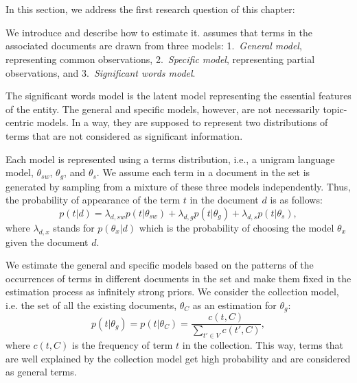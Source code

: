 \section{\SWLMs}
\label{sec:swlm}
In this section, we address the first research question of this chapter: 
\begin{resqbox}
\emph{}
\end{resqbox}
We introduce \SWLMs and describe how to estimate it. \acswlm assumes that terms in the associated documents are drawn from three models: 1.~\emph{General model}, representing common observations, 2.~\emph{Specific model}, representing partial observations, and 3.~\emph{Significant words model}. 

The significant words model is the latent model representing the essential features of the entity. The general and specific models, however, are not necessarily topic-centric models. In a way, they are supposed to represent two distributions of terms that are not considered as significant information. 

Each model is represented using a terms distribution, i.e., a unigram language model, $\theta_{sw}$, $\theta_g$, and $\theta_s$. 
We assume each term in a document in the set is generated by sampling from a mixture of these three models independently. Thus, the probability of appearance of the term $t$ in the document $d$ is as follows:
\begin{equation}
p(t|d) =  \lambda_{d,sw} p(t|\theta_{sw}) + \lambda_{d,g} p(t|\theta_g) + \lambda_{d,s} p(t|\theta_s),
\end{equation}
where $\lambda_{d,x}$ stands for $p(\theta_x|d)$ which is the probability of choosing the model $\theta_x$ given the document $d$. 

We estimate the general and specific models based on the patterns of the occurrences of terms in different documents in the set and make them fixed in the estimation process as infinitely strong priors. 
We consider the collection model, i.e. the set of all the existing documents, $\theta_C$ as an estimation for $\theta_g$:
\begin{equation}
p(t|\theta_g) = 
p(t|\theta_C) = \frac{c(t,C)}{\sum_{t' \in V} c(t',C)},
\end{equation} 
where $c(t,C)$ is the frequency of term $t$ in the collection. This way, terms that are well explained by the collection model get high probability and are considered as general terms.

